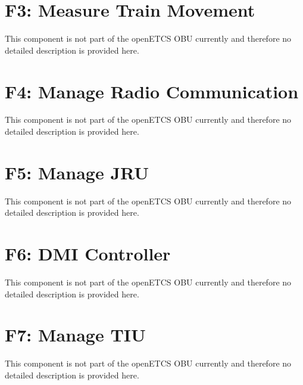 \documentclass[oneside]{template/openetcs_report}
\begin{document}





























\chapter{F3: Measure Train Movement}
This component is not part of the openETCS OBU currently and therefore no detailed description is provided here.

\chapter{F4: Manage Radio Communication}
This component is not part of the openETCS OBU currently and therefore no detailed description is provided here.

\chapter{F5: Manage JRU}
This component is not part of the openETCS OBU currently and therefore no detailed description is provided here.

\chapter{F6: DMI Controller}
This component is not part of the openETCS OBU currently and therefore no detailed description is provided here.
%

\chapter{F7: Manage TIU}
This component is not part of the openETCS OBU currently and therefore no detailed description is provided here.






\end{document}
